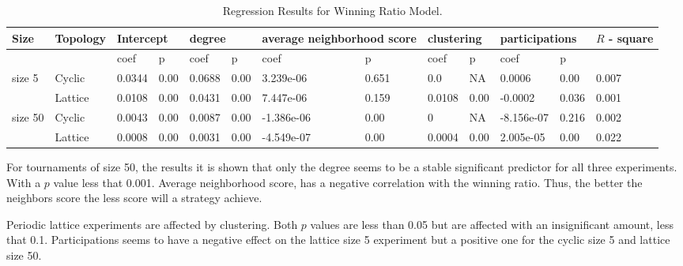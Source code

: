 \begin{table}[!hbtp]
\centering
\begin{adjustbox}{width=1\textwidth}
\small
\begin{tabular}{@{}|l|l|l|l|l|l|l|l|l|l|l|l|l|@{}}
\toprule
Size & Topology & \multicolumn{2}{l|}{Intercept} & \multicolumn{2}{l|}{degree} & \multicolumn{2}{l|}{average neighborhood score} & \multicolumn{2}{l|}{clustering} & \multicolumn{2}{l|}{participations} & \(R\) - square \\ \midrule
     &          & coef            & p            & coef          & p           & coef                      & p                    & coef             & p              & coef                & p             &          \\ \midrule
size 5  & Cyclic& 0.0344          & 0.00         & 0.0688        & 0.00        & 3.239e-06                 & 0.651                & 0.0              & NA             & 0.0006             & 0.00           & 0.007    \\ \midrule
     & Lattice  & 0.0108          & 0.00         & 0.0431        & 0.00        & 7.447e-06                 & 0.159                 & 0.0108           & 0.00           & -0.0002             & 0.036          & 0.001    \\ \midrule
size 50 & Cyclic& 0.0043          & 0.00         & 0.0087        & 0.00        & -1.386e-06                & 0.00                 & 0                & NA             & -8.156e-07          & 0.216          & 0.002    \\ \midrule
     & Lattice  & 0.0008          & 0.00         & 0.0031        & 0.00        & -4.549e-07                 & 0.00                 & 0.0004           & 0.00           & 2.005e-05          & 0.00          & 0.022    \\ \bottomrule
\end{tabular}
\end{adjustbox}
\caption{Regression Results for Winning Ratio Model.}
\label{regression-winning}
\end{table}


For tournaments of size 50, the results it is shown that only the degree seems
to be a stable significant predictor for all three experiments. With a \(p\)
value less that 0.001. Average neighborhood score, has a negative correlation
with the winning ratio. Thus, the
better the neighbors score the less score will a strategy achieve.

Periodic lattice experiments are affected by clustering. Both \(p\) values
are less than 0.05 but are affected with an insignificant amount, less that 0.1.
Participations seems to have a negative effect on the lattice size 5 experiment
but a positive one for the cyclic size 5 and lattice size 50.

